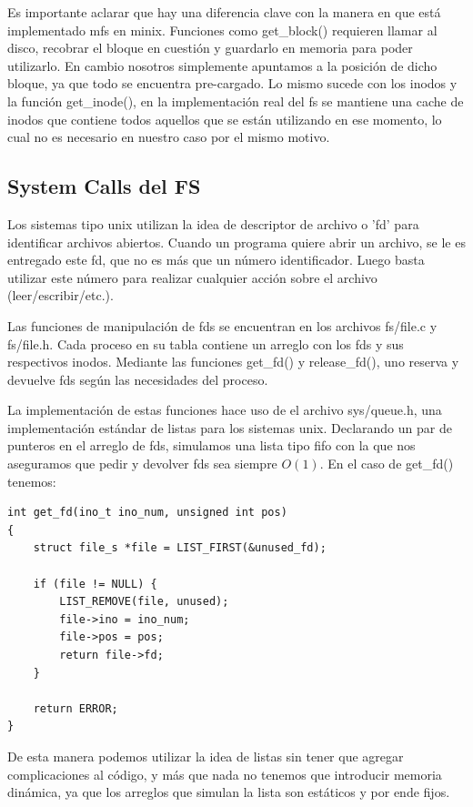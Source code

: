 Es importante aclarar que hay una diferencia clave con la manera en que está
implementado mfs en minix. Funciones como get\_block() requieren llamar al
disco, recobrar el bloque en cuestión y guardarlo en memoria para poder
utilizarlo. En cambio nosotros simplemente apuntamos a la posición de dicho
bloque, ya que todo se encuentra pre-cargado. Lo mismo sucede con los inodos y
la función get\_inode(), en la implementación real del fs se mantiene una cache
de inodos que contiene todos aquellos que se están utilizando en ese momento,
lo cual no es necesario en nuestro caso por el mismo motivo.

\subsection{System Calls del FS}

Los sistemas tipo unix utilizan la idea de descriptor de archivo o 'fd' para
identificar archivos abiertos. Cuando un programa quiere abrir un archivo, se le
es entregado este fd, que no es más que un número identificador. Luego basta
utilizar este número para realizar cualquier acción sobre el archivo
(leer/escribir/etc.).

Las funciones de manipulación de fds se encuentran en los archivos fs/file.c y
fs/file.h. Cada proceso en su tabla contiene un arreglo con los fds y
sus respectivos inodos. Mediante las funciones get\_fd() y release\_fd(), uno
reserva y devuelve fds según las necesidades del proceso.

La implementación de estas funciones hace uso de el archivo sys/queue.h, una
implementación estándar de listas para los sistemas unix. Declarando un par de
punteros en el arreglo de fds, simulamos una lista tipo fifo con la que nos
aseguramos que pedir y devolver fds sea siempre $O(1)$. En el caso de get\_fd()
tenemos:

\begin{verbatim}
int get_fd(ino_t ino_num, unsigned int pos)
{
    struct file_s *file = LIST_FIRST(&unused_fd);

    if (file != NULL) {
        LIST_REMOVE(file, unused);
        file->ino = ino_num;
        file->pos = pos;
        return file->fd;
    }

    return ERROR;
}
\end{verbatim}

De esta manera podemos utilizar la idea de listas sin tener que agregar
complicaciones al código, y más que nada no tenemos que introducir memoria
dinámica, ya que los arreglos que simulan la lista son estáticos y por ende
fijos.

